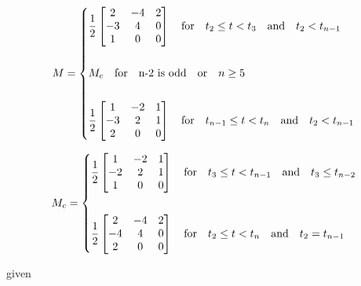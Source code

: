\documentclass{article}
\begin{document}
    \begin{equation}
        M = \begin{dcases} 
            \frac{1}{2}\begin{bmatrix} 2 & -4 & 2 \\
                                        -3 & 4 & 0 \\
                                        1 & 0 & 0 \end{bmatrix} \quad \text{for} \quad t_2 \leq t < t_{3} \quad \text{and} \quad t_2 < t_{n-1}\\\\
            M_c \quad \text{for} \quad \text{n-2 is odd} \quad \text{or} \quad n \geq 5 \\\\
            \frac{1}{2} \begin{bmatrix} 1 & -2 & 1 \\
                                        -3 & 2 & 1 \\
                                        2 & 0 & 0 \end{bmatrix} \quad \text{for} \quad t_{n-1} \leq t < t_{n} \quad \text{and} \quad t_2 < t_{n-1}
        \end{dcases}
    \end{equation}
    
    \begin{equation}
        M_c = \begin{dcases} 
            \frac{1}{2}\begin{bmatrix} 1 & -2 & 1 \\
                                        -2 & 2 & 1 \\
                                        1 & 0 & 0 \end{bmatrix} \quad \text{for} \quad t_{3} \leq t < t_{n-1} \quad \text{and} \quad t_3 \leq t_{n-2}\\\\
            \frac{1}{2} \begin{bmatrix} 2 & -4 & 2 \\
                                        -4 & 4 & 0 \\
                                        2 & 0 & 0 \end{bmatrix} \quad \text{for} \quad t_{2} \leq t < t_{n}  \quad \text{and} \quad t_2 = t_{n-1}
        \end{dcases}
    \end{equation}

        given
    
\end{document}
